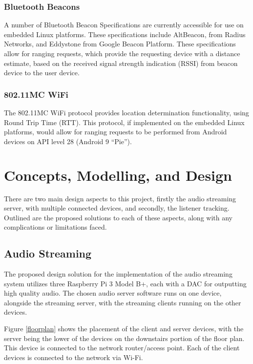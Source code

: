 \documentclass[11pt,a4paper,headinclude=false,footinclude=false]{scrreprt}
\begin{document}
\subsection{Bluetooth Beacons}\label{bluetooth-beacons}

A number of Bluetooth Beacon Specifications are currently accessible for
use on embedded Linux platforms. These specifications include
AltBeacon\cite{altbeacon}, from Radius Networks, and
Eddystone\cite{eddystone} from Google Beacon Platform. These
specifications allow for ranging requests, which provide the requesting
device with a distance estimate, based on the received signal strength
indication (RSSI) from beacon device to the user device.

\subsection{802.11MC WiFi}\label{mc-wifi}

The 802.11MC WiFi protocol provides location determination
functionality, using Round Trip Time (RTT). This protocol, if
implemented on the embedded Linux platforms, would allow for ranging
requests to be performed from Android devices on API level 28 (Android 9
``Pie'')\cite{droidRTT}.

\chapter{Concepts, Modelling, and
Design}\label{concepts-modelling-and-design}

There are two main design aspects to this project, firstly the audio
streaming server, with multiple connected devices, and secondly, the
listener tracking. Outlined are the proposed solutions to each of these
aspects, along with any complications or limitations faced.

\section{Audio Streaming}\label{audio-streaming}

The proposed design solution for the implementation of the audio
streaming system utilizes three Raspberry Pi 3 Model B+, each with a DAC
for outputting high quality audio. The chosen audio server software runs
on one device, alongside the streaming server, with the streaming
clients running on the other devices.

Figure \ref{floorplan} shows the placement of the client and server
devices, with the server being the lower of the devices on the
downstairs portion of the floor plan. This device is connected to the
network router/access point. Each of the client devices is connected to
the network via Wi-Fi.
\end{document}
